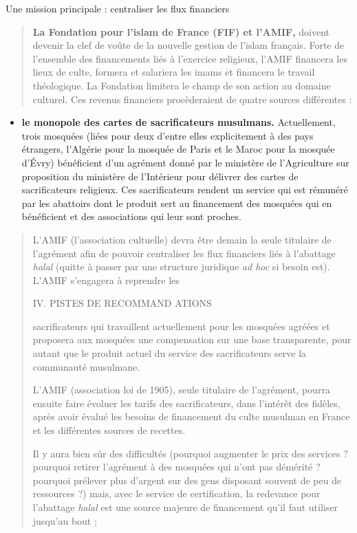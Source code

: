 Une mission principale : centraliser les flux financiers

\begin{quote}
\textbf{La Fondation pour l'islam de France (FIF) et l'AMIF,} doivent
devenir la clef de voûte de la nouvelle gestion de l'islam français.
Forte de l'ensemble des financements liés à l'exercice religieux, l'AMIF
financera les lieux de culte, formera et salariera les imams et
financera le travail théologique. La Fondation limitera le champ de son
action au domaine culturel. Ces revenus financiers procèderaient de
quatre sources différentes :
\end{quote}

\begin{itemize}
\item
  \textbf{le monopole des cartes de sacrificateurs musulmans.}
  Actuellement, trois mosquées (liées pour deux d'entre elles
  explicitement à des pays étrangers, l'Algérie pour la mosquée de Paris
  et le Maroc pour la mosquée d'Évry) bénéficient d'un agrément donné
  par le ministère de l'Agriculture sur proposition du ministère de
  l'Intérieur pour délivrer des cartes de sacrificateurs religieux. Ces
  sacrificateurs rendent un service qui est rémunéré par les abattoirs
  dont le produit sert au financement des mosquées qui en bénéficient et
  des associations qui leur sont proches.
\end{itemize}

\begin{quote}
L'AMIF (l'association cultuelle) devra être demain la seule titulaire de
l'agrément afin de pouvoir centraliser les flux financiers liés à
l'abattage \emph{halal} (quitte à passer par une structure juridique
\emph{ad hoc} si besoin est). L'AMIF s'engagera à reprendre les

IV. PISTES DE RECOMMAND ATIONS

sacrificateurs qui travaillent actuellement pour les mosquées agréées et
proposera aux mosquées une compensation sur une base transparente, pour
autant que le produit actuel du service des sacrificateurs serve la
communauté musulmane.

L'AMIF (association loi de 1905), seule titulaire de l'agrément, pourra
ensuite faire évoluer les tarifs des sacrificateurs, dans l'intérêt des
fidèles, après avoir évalué les besoins de financement du culte musulman
en France et les différentes sources de recettes.

Il y aura bien sûr des difficultés (pourquoi augmenter le prix des
services ? pourquoi retirer l'agrément à des mosquées qui n'ont pas
démérité ? pourquoi prélever plus d'argent sur des gens disposant
souvent de peu de ressources ?) mais, avec le service de certification,
la redevance pour l'abattage \emph{halal} est une source majeure de
financement qu'il faut utiliser jusqu'au bout ;
\end{quote}

